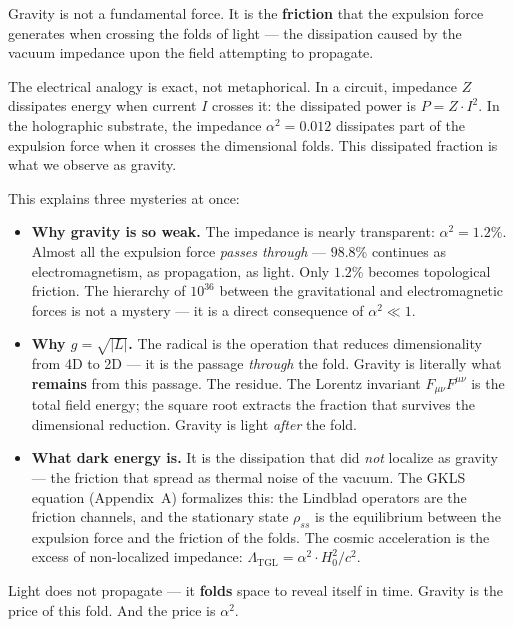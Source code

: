 \documentclass[12pt,a4paper,twoside]{article}
\newcommand{\alphaii}{\alpha^{2}}
\begin{document}
Gravity is not a fundamental force. It is the \textbf{friction} that the expulsion force generates when crossing the folds of light --- the dissipation caused by the vacuum impedance upon the field attempting to propagate.

The electrical analogy is exact, not metaphorical. In a circuit, impedance $Z$ dissipates energy when current $I$ crosses it: the dissipated power is $P = Z \cdot I^2$. In the holographic substrate, the impedance $\alphaii = 0.012$ dissipates part of the expulsion force when it crosses the dimensional folds. This dissipated fraction is what we observe as gravity.

This explains three mysteries at once:

\begin{itemize}[nosep]
\item \textbf{Why gravity is so weak.} The impedance is nearly transparent: $\alphaii = 1.2\%$. Almost all the expulsion force \textit{passes through} --- $98.8\%$ continues as electromagnetism, as propagation, as light. Only $1.2\%$ becomes topological friction. The hierarchy of $10^{36}$ between the gravitational and electromagnetic forces is not a mystery --- it is a direct consequence of $\alphaii \ll 1$.

\item \textbf{Why $g = \sqrt{|L|}$.} The radical is the operation that reduces dimensionality from 4D to 2D --- it is the passage \textit{through} the fold. Gravity is literally what \textbf{remains} from this passage. The residue. The Lorentz invariant $F_{\mu\nu}F^{\mu\nu}$ is the total field energy; the square root extracts the fraction that survives the dimensional reduction. Gravity is light \textit{after} the fold.

\item \textbf{What dark energy is.} It is the dissipation that did \textit{not} localize as gravity --- the friction that spread as thermal noise of the vacuum. The GKLS equation (Appendix~A) formalizes this: the Lindblad operators are the friction channels, and the stationary state $\rho_{ss}$ is the equilibrium between the expulsion force and the friction of the folds. The cosmic acceleration is the excess of non-localized impedance: $\Lambda_{\text{TGL}} = \alphaii \cdot H_0^2 / c^2$.
\end{itemize}

\noindent Light does not propagate --- it \textbf{folds} space to reveal itself in time. Gravity is the price of this fold. And the price is $\alphaii$.
\end{document}
